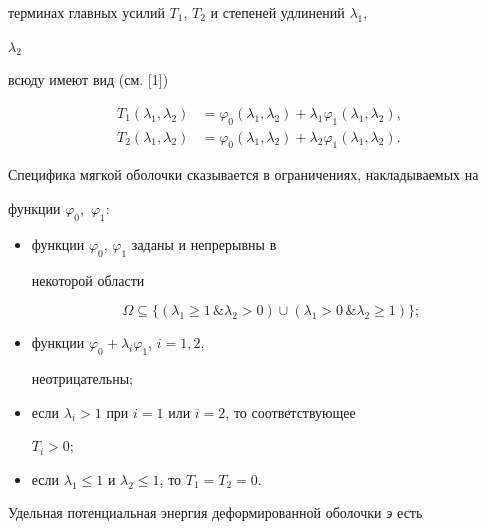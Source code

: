 терминах главных усилий $T_1$, $T_2$ и степеней удлинений $\lambda_1$,


$\lambda_2$


всюду имеют вид (см. [1])


\begin{equation}


\begin{split}


T_1(\lambda_1,\lambda_2)&=\varphi_0(\lambda_1,\lambda_2)+


\lambda_1\varphi_1(\lambda_1,\lambda_2),\\


T_2(\lambda_1,\lambda_2)&=\varphi_0(\lambda_1,\lambda_2)+


\lambda_2\varphi_1(\lambda_1,\lambda_2).


\end{split}


\end{equation}





Специфика мягкой оболочки сказывается в ограничениях, накладываемых на


функции $\varphi_0$,~$\varphi_1$:


\begin{itemize}


\item[1)] функции $\varphi_0$, $\varphi_1$ заданы и непрерывны в


некоторой области


$$


\Omega\subseteq\{(\lambda_1\ge 1\,\&\lambda_2>0)\cup


(\lambda_1>0\,\&\lambda_2\ge 1)\};


$$


\item[2)] функции $\varphi_0+\lambda_i\varphi_1$, $i=1,2,$


неотрицательны;


\item[3)] если $\lambda_i>1$ при $i=1$ или $i=2$, то соответствующее


$T_i>0$;


\item[4)] если $\lambda_1\le 1$ и $\lambda_2\le 1$, то $T_1=T_2=0$.


\end{itemize}





Удельная потенциальная энергия деформированной оболочки {\it э} есть



